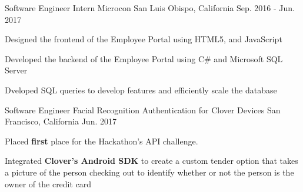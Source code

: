 \begin{cventries}

\cventry
{Software Engineer Intern} %
{Microcon} %
{San Luis Obispo, California} %
{Sep. 2016 - Jun. 2017} %
{ %
\begin{cvitems}
\item {Designed the frontend of the Employee Portal using HTML5, and JavaScript}
\item {Developed the backend of the Employee Portal using C\# and Microsoft SQL Server}
\item {Dveloped SQL queries to develop features and efficiently scale the database}
\end{cvitems}
}



\cventry
{Software Engineer} %
{Facial Recognition Authentication for Clover Devices} %
{San Francisco, California} %
{Jun. 2017} %
{ %
\begin{cvitems}
\item {Placed \textbf{first} place for the Hackathon's API challenge.}
\item {Integrated \textbf{Clover's Android SDK} to create a custom tender option that takes a picture of the person checking out to identify whether or not the person is the owner of the credit card}
\end{cvitems}
}

\end{cventries}
